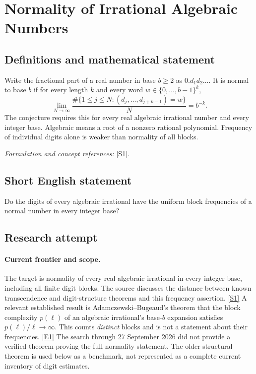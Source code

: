 \documentclass[11pt,a4paper]{article}
\newcommand{\sref}[2]{\hyperlink{source:#1:#2}{[S#2]}}
\newcommand{\eref}[2]{\hyperlink{extra:#1:#2}{[E#2]}}
\newif\ifshowcatalogue
\newcommand{\cataloguescope}[1]{\ifshowcatalogue
 \paragraph{Exact scope in the supplied catalogue.}
 \begin{quote}\small #1\end{quote}\fi}
\numberwithin{equation}{section}
\begin{document}
\setcounter{section}{0}
\setlength{\parskip}{3pt plus 1pt}
\clearpage
\section*{\texorpdfstring{Normality of Irrational Algebraic Numbers}{Normality of Irrational Algebraic Numbers}}\label{statement}
\subsection{Definitions and mathematical statement}
Write the fractional part of a real number in base $b\ge2$ as $0.d_1d_2\ldots$. It is normal to base $b$ if for every length $k$ and every word $w\in\{0,\ldots,b-1\}^k$,
\[
 \lim_{N\to\infty}\frac{\#\{1\le j\le N:(d_j,\ldots,d_{j+k-1})=w\}}{N}=b^{-k}.
\]
The conjecture requires this for every real algebraic irrational number and every integer base. Algebraic means a root of a nonzero rational polynomial. Frequency of individual digits alone is weaker than normality of all blocks.
\par\smallskip\textit{Formulation and concept references:} \sref{statement}{1}.
\cataloguescope{Prove or disprove that every real irrational algebraic number is normal to every integer base b >= 2.}
\subsection{Short English statement}
Do the digits of every algebraic irrational have the uniform block frequencies of a normal number in every integer base?
\subsection{Research attempt}

\paragraph{Current frontier and scope.}
The target is normality of every real algebraic irrational in every
integer base, including all finite digit blocks.  The source discusses
the distance between known transcendence and digit-structure theorems
and this frequency assertion. \sref{statement}{1}
A relevant established result is Adamczewski--Bugeaud's theorem that
the block complexity $p(\ell)$ of an algebraic irrational's base-$b$
expansion satisfies $p(\ell)/\ell\to\infty$.  This counts \emph{distinct}
blocks and is not a statement about their frequencies.
\eref{statement}{1}  The search through 27 September 2026 did not provide a
verified theorem proving the full normality statement.  The older
structural theorem is used below as a benchmark, not represented as
a complete current inventory of digit estimates.
\end{document}

